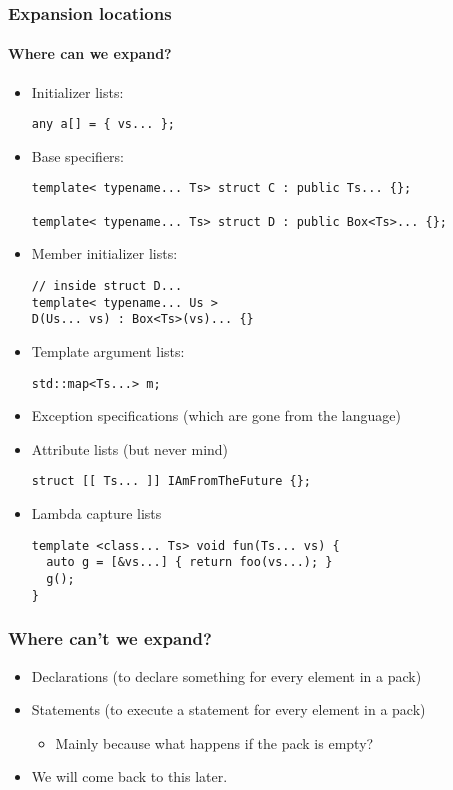 \begin{frame}[fragile,t]
\frametitle{Expansion locations}
\framesubtitle{Where can we expand?}
\begin{itemize}[<+->]
\item Initializer lists:
{\scriptsize\begin{verbatim}
any a[] = { vs... };
\end{verbatim}
}
\item Base specifiers:
{\scriptsize\begin{verbatim}
template< typename... Ts> struct C : public Ts... {};

template< typename... Ts> struct D : public Box<Ts>... {};
\end{verbatim}
}

\item Member initializer lists:
{\scriptsize\begin{verbatim}
// inside struct D...
template< typename... Us >
D(Us... vs) : Box<Ts>(vs)... {}
\end{verbatim}
}

\item Template argument lists:
{\scriptsize\begin{verbatim}
std::map<Ts...> m;
\end{verbatim}
}

\item Exception specifications (which are gone from the language)
\item Attribute lists (but never mind)
{\scriptsize\begin{verbatim}
struct [[ Ts... ]] IAmFromTheFuture {};
\end{verbatim}
}

\item Lambda capture lists
{\scriptsize\begin{verbatim}
template <class... Ts> void fun(Ts... vs) {
  auto g = [&vs...] { return foo(vs...); }
  g();
}
\end{verbatim}
}
\end{itemize}
\end{frame}

\begin{frame}[fragile,t]
\frametitle{Where can't we expand?}
\begin{itemize}[<+->]
\item Declarations (to declare something for every element in a pack)
\item Statements (to execute a statement for every element in a pack)
\begin{itemize}
  \item Mainly because what happens if the pack is empty?

\end{itemize}
\item We will come back to this later.
\end{itemize}
\end{frame}


